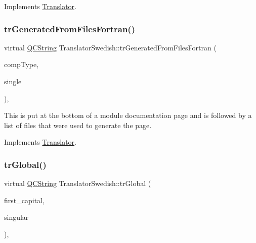 Implements \mbox{\hyperlink{class_translator}{Translator}}.

\mbox{\label{class_translator_swedish_a634e31e70dca60b2d9118c57b484eb2f}} 
\subsubsection{\texorpdfstring{trGeneratedFromFilesFortran()}{trGeneratedFromFilesFortran()}}
{\footnotesize\ttfamily virtual \mbox{\hyperlink{class_q_c_string}{Q\+C\+String}} Translator\+Swedish\+::tr\+Generated\+From\+Files\+Fortran (\begin{DoxyParamCaption}\item[{\mbox{\hyperlink{class_class_def_ae70cf86d35fe954a94c566fbcfc87939}{Class\+Def\+::\+Compound\+Type}}}]{comp\+Type,  }\item[{bool}]{single }\end{DoxyParamCaption})\hspace{0.3cm}{\ttfamily [inline]}, {\ttfamily [virtual]}}

This is put at the bottom of a module documentation page and is followed by a list of files that were used to generate the page. 

Implements \mbox{\hyperlink{class_translator}{Translator}}.

\mbox{\label{class_translator_swedish_aed9e16cc2dbe30bb5ab30cf7ddc7f4cb}} 
\subsubsection{\texorpdfstring{trGlobal()}{trGlobal()}}
{\footnotesize\ttfamily virtual \mbox{\hyperlink{class_q_c_string}{Q\+C\+String}} Translator\+Swedish\+::tr\+Global (\begin{DoxyParamCaption}\item[{bool}]{first\+\_\+capital,  }\item[{bool}]{singular }\end{DoxyParamCaption})\hspace{0.3cm}{\ttfamily [inline]}, {\ttfamily [virtual]}}

